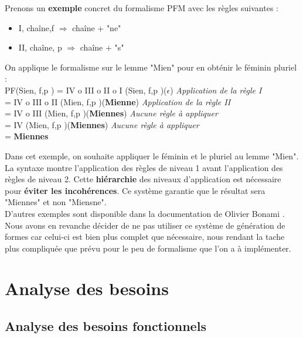 \documentclass[a4paper, 12pt]{article}
\begin{document}
Prenons un \textbf{exemple} concret du formalisme PFM avec les règles suivantes : 
\begin{itemize}
    \item I, chaîne,{f} $\Longrightarrow$ chaîne + "ne"
    \item II, chaîne, {p} $\Longrightarrow$ chaîne + "s"
\end{itemize}


On applique le formalisme sur le lemme "Mien" pour en obténir le féminin pluriel : \\
PF(Sien, {f,p} ) = IV o III o II o I (Sien, {f,p} )(\textbf{$\epsilon$}) \textit{Application de la règle I} \\
                 = IV o III o II (Mien, {f,p} )(\textbf{Mienne}) \textit{Application de la règle II} \\
                 = IV o III (Mien, {f,p} )(\textbf{Miennes}) \textit{Aucune règle à appliquer} \\
                 = IV (Mien, {f,p} )(\textbf{Miennes}) \textit{Aucune règle à appliquer} \\
                 =\textbf{ Miennes }

Dans cet exemple, on souhaite appliquer le féminin et le pluriel au lemme "Mien".
La syntaxe montre l'application des règles de niveau 1 avant l'application des règles de niveau 2.
Cette \textbf{hiérarchie} des niveaux d'application est nécessaire pour \textbf{éviter les incohérences}. Ce système garantie que le résultat sera "Miennes" et non "Miensne". \\
D'autres exemples sont disponible dans la documentation de Olivier Bonami \cite{PFM}. \\
Nous avons en revanche décider de ne pas utiliser ce système de génération de formes car celui-ci est bien plus complet que nécessaire, nous rendant la tache plus compliquée que prévu pour le peu de formalisme que l'on a à implémenter.
\section{Analyse des besoins}
\subsection{Analyse des besoins fonctionnels}
\end{document}
